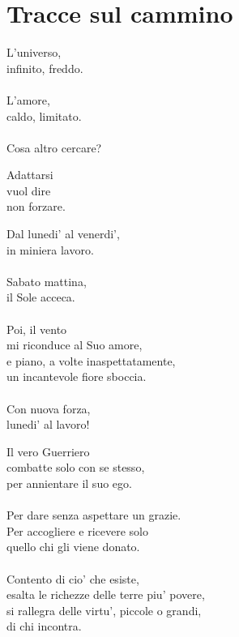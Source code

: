 \chapter{Tracce sul cammino}

\vfill

\begin{haiku}
L'universo,\\
infinito, freddo.\\
\leavevmode\\
L'amore,\\
caldo, limitato.\\
\leavevmode\\
Cosa altro cercare?\\
\end{haiku}

\begin{haiku}
Adattarsi \\
vuol dire\\
non forzare.\\
\end{haiku}

\begin{haiku}
Dal lunedi' al venerdi',\\
in miniera lavoro.\\
\leavevmode\\
Sabato mattina,\\
il Sole acceca.\\
\leavevmode\\
Poi, il vento\\
mi riconduce al Suo amore,\\
e piano, a volte inaspettatamente,\\
un incantevole fiore sboccia.\\
\leavevmode\\
Con nuova forza,\\
lunedi' al lavoro!\\
\end{haiku}

\begin{haiku}
Il vero Guerriero\\
combatte solo con se stesso,\\
per annientare il suo ego.\\
\leavevmode\\
Per dare senza aspettare un grazie.\\
Per accogliere e ricevere solo\\
quello chi gli viene donato.\\
\leavevmode\\
Contento di cio' che esiste,\\
esalta le richezze delle terre piu' povere,\\
si rallegra delle virtu', piccole o grandi,\\
di chi incontra.\\
\end{haiku}

